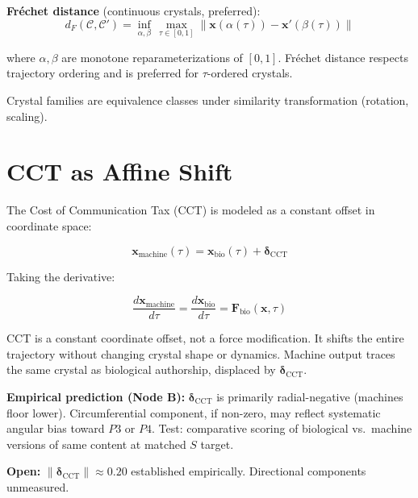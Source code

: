 \documentclass{article}
\begin{document}
\textbf{Fr\'{e}chet distance} (continuous crystals, preferred):
\begin{equation}
d_F(\mathcal{C}, \mathcal{C}') =
  \inf_{\alpha,\beta}\,
  \max_{\tau \in [0,1]}
  \|\mathbf{x}(\alpha(\tau)) - \mathbf{x}'(\beta(\tau))\|
\end{equation}

where $\alpha, \beta$ are monotone reparameterizations of $[0,1]$.
Fréchet distance respects trajectory ordering and is preferred
for $\tau$-ordered crystals.

Crystal families are equivalence classes under similarity
transformation (rotation, scaling).

\section{CCT as Affine Shift}

The Cost of Communication Tax (CCT) is modeled as a constant
offset in coordinate space:

\begin{equation}
\mathbf{x}_{\text{machine}}(\tau) =
  \mathbf{x}_{\text{bio}}(\tau) + \boldsymbol{\delta}_{\text{CCT}}
\end{equation}

Taking the derivative:

\begin{equation}
\frac{d\mathbf{x}_{\text{machine}}}{d\tau} =
\frac{d\mathbf{x}_{\text{bio}}}{d\tau} =
\mathbf{F}_{\text{bio}}(\mathbf{x}, \tau)
\end{equation}

CCT is a constant coordinate offset, not a force modification.
It shifts the entire trajectory without changing crystal shape
or dynamics. Machine output traces the same crystal as biological
authorship, displaced by $\boldsymbol{\delta}_{\text{CCT}}$.

\textbf{Empirical prediction (Node B):} $\boldsymbol{\delta}_{\text{CCT}}$
is primarily radial-negative (machines floor lower). Circumferential
component, if non-zero, may reflect systematic angular bias toward
$P3$ or $P4$. Test: comparative scoring of biological vs.\ machine
versions of same content at matched $S$ target.

\textbf{Open:} $\|\boldsymbol{\delta}_{\text{CCT}}\| \approx 0.20$
established empirically. Directional components unmeasured.
\end{document}
